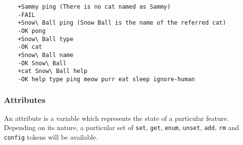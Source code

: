 \documentclass[../main.tex]{subfiles}
\begin{document}
\begin{lstlisting}
    +Sammy ping (There is no cat named as Sammy)
    -FAIL
    +Snow\ Ball ping (Snow Ball is the name of the referred cat)
    -OK pong
    +Snow\ Ball type
    -OK cat
    +Snow\ Ball name
    -OK Snow\ Ball
    +cat Snow\ Ball help
    -OK help type ping meow purr eat sleep ignore-human

\end{lstlisting}

\subsubsection{Attributes}
An attribute is a variable which represents the state of a particular feature. Depending on its nature, a particular set of \texttt{set}, \texttt{get}, \texttt{enum}, \texttt{unset}, \texttt{add}, \texttt{rm} and \texttt{config} tokens will be available. 
\end{document}
